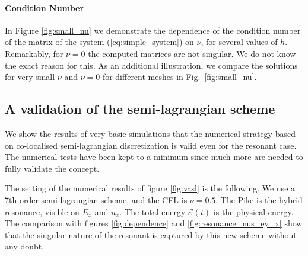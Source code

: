\paragraph{Condition Number}
In Figure \ref{fig:small_nu} we demonstrate the dependence of the condition number of the matrix of the system (\ref{eq:simple_system}) 
on $\nu$, for several values of $h$.
Remarkably, for $\nu=0$ the computed matrices are not singular. We do not know the exact reason for this.
As an additional illustration, we compare the solutions for very small $\nu$ and $\nu=0$ for different meshes in Fig.~\ref{fig:small_nu}. 

\FloatBarrier

\subsection{A validation of the semi-lagrangian scheme}

We show the results of very basic simulations that the numerical strategy 
based on co-localised semi-lagrangian discretization is valid even for the resonant 
case.
The numerical tests have been kept to a minimum since much more are needed to fully validate
the concept.

The setting of the numerical results of figure \ref{fig:vasl}
is the following. We use a 7th order semi-lagrangian scheme, and the CFL is $\nu=0.5$.
The Pike is the hybrid resonance, visible on $E_x$ and $u_x$.
The total energy $\mathcal E(t)$ is the physical energy. 
The comparison with figures \ref{fig:dependence} and \ref{fig:resonance_nus_ey_x} show that the 
singular nature of the resonant is captured by this new scheme without any doubt.

